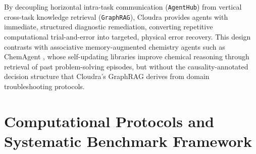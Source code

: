 \documentclass[10pt,twocolumn,letterpaper]{article}
\begin{document}
By decoupling horizontal intra-task communication (\texttt{AgentHub}) from vertical cross-task knowledge retrieval (\texttt{GraphRAG}), Cloudra provides agents with immediate, structured diagnostic remediation, converting repetitive computational trial-and-error into targeted, physical error recovery. This design contrasts with associative memory-augmented chemistry agents such as ChemAgent \cite{tang2025chemagent}, whose self-updating libraries improve chemical reasoning through retrieval of past problem-solving episodes, but without the causality-annotated decision structure that Cloudra's GraphRAG derives from domain troubleshooting protocols.

\section{Computational Protocols and Systematic Benchmark Framework}
\end{document}
